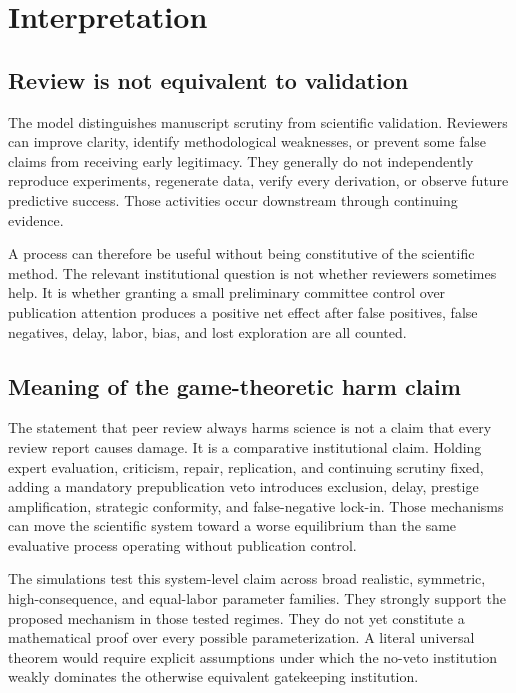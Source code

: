 \section{Interpretation}

\subsection{Review is not equivalent to validation}

The model distinguishes manuscript scrutiny from scientific validation. Reviewers can improve clarity, identify methodological weaknesses, or prevent some false claims from receiving early legitimacy. They generally do not independently reproduce experiments, regenerate data, verify every derivation, or observe future predictive success. Those activities occur downstream through continuing evidence.

A process can therefore be useful without being constitutive of the scientific method. The relevant institutional question is not whether reviewers sometimes help. It is whether granting a small preliminary committee control over publication attention produces a positive net effect after false positives, false negatives, delay, labor, bias, and lost exploration are all counted.

\subsection{Meaning of the game-theoretic harm claim}

The statement that peer review always harms science is not a claim that every review report causes damage. It is a comparative institutional claim. Holding expert evaluation, criticism, repair, replication, and continuing scrutiny fixed, adding a mandatory prepublication veto introduces exclusion, delay, prestige amplification, strategic conformity, and false-negative lock-in. Those mechanisms can move the scientific system toward a worse equilibrium than the same evaluative process operating without publication control.

The simulations test this system-level claim across broad realistic, symmetric, high-consequence, and equal-labor parameter families. They strongly support the proposed mechanism in those tested regimes. They do not yet constitute a mathematical proof over every possible parameterization. A literal universal theorem would require explicit assumptions under which the no-veto institution weakly dominates the otherwise equivalent gatekeeping institution.

